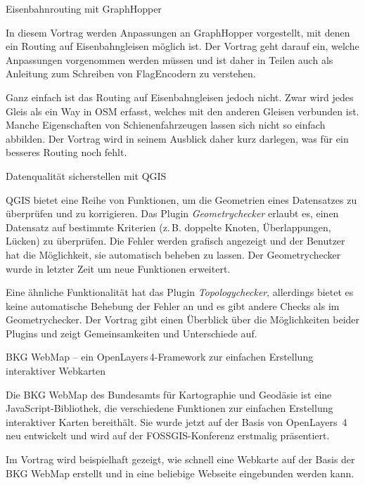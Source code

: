 %
{Eisenbahnrouting mit GraphHopper}%
{}%
{%
In diesem Vortrag werden Anpassungen an GraphHopper vorgestellt, mit denen ein Routing auf
Eisenbahngleisen möglich ist. Der Vortrag geht darauf ein, welche Anpassungen vorgenommen werden
müssen und ist daher in Teilen auch als Anleitung zum Schreiben von FlagEncodern zu verstehen.

Ganz einfach ist das Routing auf Eisenbahngleisen jedoch nicht. Zwar wird jedes Gleis als ein Way in
OSM erfasst, welches mit den anderen Gleisen verbunden ist. Manche Eigenschaften von
Schienenfahrzeugen lassen sich nicht so einfach abbilden. Der Vortrag wird in seinem Ausblick daher
kurz darlegen, was für ein besseres Routing noch fehlt.%
}


%
{Datenqualität sicherstellen mit QGIS}%
{}%
{%
QGIS bietet eine Reihe von Funktionen, um die Geometrien eines Datensatzes zu
überprüfen und zu korrigieren. Das Plugin \emph{Geometrychecker} erlaubt es, einen
Datensatz auf bestimmte Kriterien (z.\,B. doppelte Knoten, Überlappungen,
Lücken) zu überprüfen. Die Fehler werden grafisch angezeigt und der
Benutzer hat die Möglichkeit, sie automatisch beheben zu lassen. Der
Geometrychecker wurde in letzter Zeit um neue Funktionen erweitert.

Eine ähnliche Funktionalität hat das Plugin \emph{Topologychecker},
allerdings bietet es keine automatische Behebung der Fehler an und es gibt
andere Checks als im Geometrychecker. Der Vortrag gibt einen Überblick über
die Möglichkeiten beider Plugins und zeigt Gemeinsamkeiten und Unterschiede
auf.
}

%
{BKG WebMap -- ein OpenLayers\,4-Framework zur einfachen Erstellung interaktiver Webkarten}%
{}%
{%
Die BKG WebMap des Bundesamts für Kartographie und Geodäsie ist eine JavaScript-Bibliothek, die
verschiedene Funktionen zur einfachen Erstellung interaktiver Karten bereithält. Sie wurde jetzt auf
der Basis von OpenLayers~4 neu entwickelt und wird auf der FOSSGIS-Konferenz erstmalig präsentiert.

Im Vortrag wird beispielhaft gezeigt, wie schnell eine Webkarte auf der Basis
der BKG WebMap erstellt und in eine beliebige Webseite eingebunden werden kann.
}

